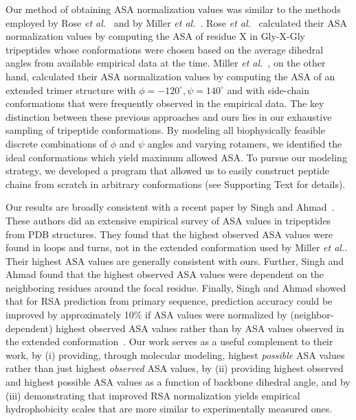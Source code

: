 \documentclass[11pt]{article}
\begin{document}
Our method of obtaining ASA normalization values was similar to the methods employed by Rose \emph{et al.}~\cite{Rose1985} and by Miller \emph{et al.}~\cite{Miller1987}. Rose \emph{et al.}~\cite{Rose1985} calculated their ASA normalization values by computing the ASA of residue X in Gly-X-Gly tripeptides whose conformations were chosen based on the average dihedral angles from available empirical data at the time. Miller \emph{et al.}~\cite{Miller1987}, on the other hand, calculated their ASA normalization values by computing the ASA of an extended trimer structure with $\phi = -120^\circ, \psi= 140^\circ$ and with side-chain conformations that were frequently observed in the empirical data. The key distinction between these previous approaches and ours lies in our exhaustive sampling of tripeptide conformations. By modeling all biophysically feasible discrete combinations of $\phi$ and $\psi$ angles and varying rotamers, we identified the ideal conformations which yield maximum allowed ASA. To pursue our modeling strategy, we developed a program that allowed us to easily construct peptide chains from scratch in arbitrary conformations (see Supporting Text for details).

Our results are broadly consistent with a recent paper by Singh and Ahmad~\cite{SinghAhmad2009}. These authors did an extensive empirical survey of ASA values in tripeptides from PDB structures. They found that the highest observed ASA values were found in loops and turns, not in the extended conformation used by Miller \emph{et al.}. Their highest ASA values are generally consistent with ours. Further, Singh and Ahmad found that the highest observed ASA values were dependent on the neighboring residues around the focal residue. Finally, Singh and Ahmad showed that for RSA prediction from primary sequence, prediction accuracy could be improved by approximately 10\% if ASA values were normalized by (neighbor-dependent) highest observed ASA values rather than by ASA values observed in the extended conformation~\cite{SinghAhmad2009}. Our work serves as a useful complement to their work, by (i) providing, through molecular modeling, highest \emph{possible} ASA values rather than just highest \emph{observed} ASA values, by (ii) providing highest observed and highest possible ASA values as a function of backbone dihedral angle, and by (iii) demonstrating that improved RSA normalization yields empirical hydrophobicity scales that are more similar to experimentally measured ones.
\end{document}
